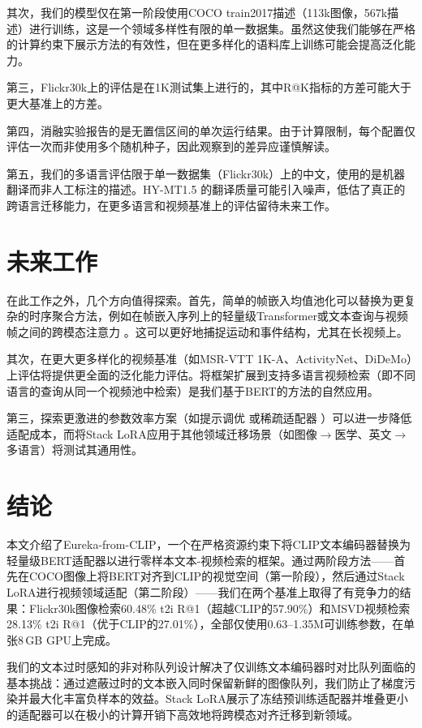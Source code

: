 \documentclass[10pt,a4paper]{ctexart}
\begin{document}
其次，我们的模型仅在第一阶段使用COCO train2017描述（113k图像，567k描述）进行训练，这是一个领域多样性有限的单一数据集。虽然这使我们能够在严格的计算约束下展示方法的有效性，但在更多样化的语料库上训练可能会提高泛化能力。

第三，Flickr30k上的评估是在1K测试集上进行的，其中R@K指标的方差可能大于更大基准上的方差。

第四，消融实验报告的是无置信区间的单次运行结果。由于计算限制，每个配置仅评估一次而非使用多个随机种子，因此观察到的差异应谨慎解读。

第五，我们的多语言评估限于单一数据集（Flickr30k）上的中文，使用的是机器翻译而非人工标注的描述。HY-MT1.5 \citep{hymt152025tencent}的翻译质量可能引入噪声，低估了真正的跨语言迁移能力，在更多语言和视频基准上的评估留待未来工作。

\section{未来工作}

在此工作之外，几个方向值得探索。首先，简单的帧嵌入均值池化可以替换为更复杂的时序聚合方法，例如在帧嵌入序列上的轻量级Transformer或文本查询与视频帧之间的跨模态注意力 \citep{gorti2022xpool}。这可以更好地捕捉运动和事件结构，尤其在长视频上。

其次，在更大更多样化的视频基准（如MSR-VTT 1K-A、ActivityNet、DiDeMo）上评估将提供更全面的泛化能力评估。将框架扩展到支持多语言视频检索（即不同语言的查询从同一个视频池中检索）是我们基于BERT的方法的自然应用。

第三，探索更激进的参数效率方案（如提示调优 \citep{huang2023vop} 或稀疏适配器 \citep{cao2024acl}）可以进一步降低适配成本，而将Stack LoRA应用于其他领域迁移场景（如图像$\to$医学、英文$\to$多语言）将测试其通用性。

\section{结论}

本文介绍了Eureka-from-CLIP，一个在严格资源约束下将CLIP文本编码器替换为轻量级BERT适配器以进行零样本文本-视频检索的框架。通过两阶段方法——首先在COCO图像上将BERT对齐到CLIP的视觉空间（第一阶段），然后通过Stack LoRA进行视频领域适配（第二阶段）——我们在两个基准上取得了有竞争力的结果：Flickr30k图像检索60.48\% t2i R@1（超越CLIP的57.90\%）和MSVD视频检索28.13\% t2i R@1（优于CLIP的27.01\%），全部仅使用0.63--1.35M可训练参数，在单张8\,GB GPU上完成。

我们的文本过时感知的非对称队列设计解决了仅训练文本编码器时对比队列面临的基本挑战：通过遮蔽过时的文本嵌入同时保留新鲜的图像队列，我们防止了梯度污染并最大化丰富负样本的效益。Stack LoRA展示了冻结预训练适配器并堆叠更小的适配器可以在极小的计算开销下高效地将跨模态对齐迁移到新领域。
\end{document}
